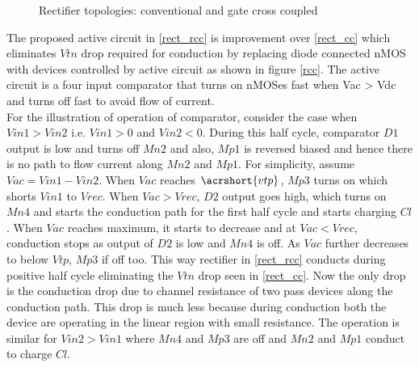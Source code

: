\documentclass[12pt,a4paper,UKenglish]{article}
\begin{document}
\begin{figure} [htbp]
  \centering 
\hfill
 \caption{Rectifier topologies: conventional and gate cross coupled} 
\label{rect_conv_cc} 
\end{figure}

The proposed active circuit in \ref{rect_rcc} is improvement over \ref{rect_cc} which eliminates $Vtn$ drop required for conduction by replacing diode connected nMOS with devices controlled by active circuit as shown in figure \ref{rcc}. The active circuit is a four input comparator that turns on nMOSes fast when Vac > Vdc and turns off fast to avoid flow of current. \\

For the illustration of operation of comparator, consider the case when $Vin1 > Vin2$ i.e. $Vin1 > 0$ and $Vin2 < 0$. During this half cycle, comparator $D1$ output is low and turns off $Mn2$ and also, $Mp1$ is reversed biased and hence there is no path to flow current along $Mn2$ and $Mp1$. For simplicity, assume $Vac =  Vin1 - Vin2$. When $Vac$ reaches $\acrshort{vtp}$, $Mp3$ turns on which shorts $Vin1$ to $Vrec$. When $Vac > Vrec$, $D2$ output goes high, which turns on $Mn4$ and starts the conduction path for the first half cycle and starts charging $Cl$. When $Vac$ reaches maximum, it starts to decrease and at $Vac < Vrec$, conduction stops as output of $D2$ is low and $Mn4$ is off. As $Vac$ further decreases to below $Vtp$, $Mp3$ if off too. This way rectifier in \ref{rect_rcc}  conducts during positive half cycle eliminating the $Vtn$ drop seen in \ref{rect_cc}. Now the only drop is the conduction drop due to channel resistance of two pass devices along the conduction path. This drop is much less because during conduction both the device are operating in the linear region with small resistance. The operation is similar for $Vin2 > Vin1$ where $Mn4$ and $Mp3$ are off and $Mn2$ and $Mp1$ conduct to charge $Cl$. \\
\end{document}
